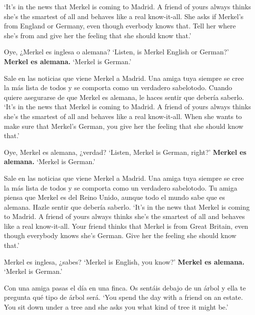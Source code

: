 \begin{exe}
	\glt `It's in the news that Merkel is coming to Madrid. A friend of yours always thinks she's the smartest of all and behaves like a real know-it-all. She asks if Merkel's from England or Germany, even though everbody knows that. Tell her where she's from and give her the feeling that she should know that.' 
	\begin{xlist}[A:]
	 Oye, ¿Merkel es inglesa o alemana? \href{https://osf.io/bx2hw/}{\faVolumeUp}
	\glt `Listen, is Merkel English or German?' 
	 \textbf{Merkel es alemana.} 
	\glt `Merkel is German.' 
	\end{xlist}
\ex \label{ex:experimentoOBVCONFalemana_APP}
	Sale en las noticias que viene Merkel a Madrid. Una amiga tuya siempre se cree la más lista de todos y se comporta como un verdadero sabelotodo. Cuando quiere asegurarse de que Merkel es alemana, le haces sentir que debería saberlo. 
	\glt `It's in the news that Merkel is coming to Madrid. A friend of yours always thinks she's the smartest of all and behaves like a real know-it-all. When she wants to make sure that Merkel's German, you give her the feeling that she should know that.' 
	\begin{xlist}[A:]
	 Oye, Merkel es alemana, ¿verdad? \href{https://osf.io/juzy8/}{\faVolumeUp}
	\glt `Listen, Merkel is German, right?' 
	 \textbf{Merkel es alemana.} 
	\glt `Merkel is German.' 
	\end{xlist}
\ex \label{ex:experimentoOBVDENalemana_APP}
	Sale en las noticias que viene Merkel a Madrid. Una amiga tuya siempre se cree la más lista de todos y se comporta como un verdadero sabelotodo. Tu amiga piensa que Merkel es del Reino Unido, aunque todo el mundo sabe que es alemana. Hazle sentir que debería saberlo. 
	\glt `It's in the news that Merkel is coming to Madrid. A friend of yours always thinks she's the smartest of all and behaves like a real know-it-all. Your friend thinks that Merkel is from Great Britain, even though everybody knows she's German. Give her the feeling she should know that.' 
	\begin{xlist}[A:]
	 Merkel es inglesa, ¿sabes? \href{https://osf.io/ctxg3/}{\faVolumeUp}
	\glt `Merkel is English, you know?' 
	 \textbf{Merkel es alemana.} 
	\glt `Merkel is German.' 
	\end{xlist}
\ex \label{ex:experimentoNEUTRALDECLmandarin_APP}
	Con una amiga pasas el día en una finca. Os sentáis debajo de un árbol y ella te pregunta qué tipo de árbol será. 
	\glt `You spend the day with a friend on an estate. You sit down under a tree and she asks you what kind of tree it might be.' 

\end{exe}
